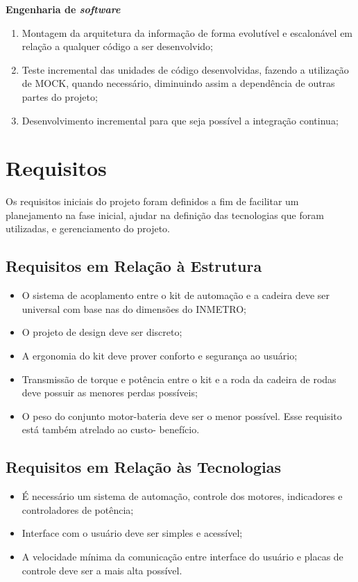 \textbf{Engenharia de \textit{software}}
  \begin{enumerate}
    \item Montagem da arquitetura da informação de forma evolutível e escalonável em relação a qualquer código a ser desenvolvido;
    \item Teste incremental das unidades de código desenvolvidas, fazendo a utilização de MOCK, quando necessário, diminuindo assim a dependência de outras partes do projeto;
    \item Desenvolvimento incremental para que seja possível a integração continua;
  \end{enumerate}

\section{Requisitos}

Os requisitos iniciais do projeto foram definidos a fim de facilitar um planejamento na fase inicial, ajudar na definição das tecnologias que foram utilizadas, e gerenciamento do projeto.

\subsection{Requisitos em Relação à Estrutura}

  \begin{itemize}
    \item O sistema de acoplamento entre o kit de automação e a cadeira deve ser universal com base nas do dimensões do INMETRO;
    \item O projeto de design deve ser discreto;
    \item A ergonomia do kit deve prover conforto e segurança ao usuário;
    \item Transmissão de torque e potência entre o kit e a roda da cadeira de rodas deve possuir as menores perdas possíveis;
    \item O peso do conjunto motor-bateria deve ser o menor possível. Esse requisito está também atrelado ao custo- benefício.

  \end{itemize}

\subsection{Requisitos em Relação às Tecnologias}

  \begin{itemize}
    \item É necessário um sistema de automação, controle dos motores, indicadores e controladores de potência;
    \item Interface com o usuário deve ser simples e acessível;
    \item A velocidade mínima da comunicação entre interface do usuário e placas de controle deve ser a mais alta possível.
  \end{itemize}

